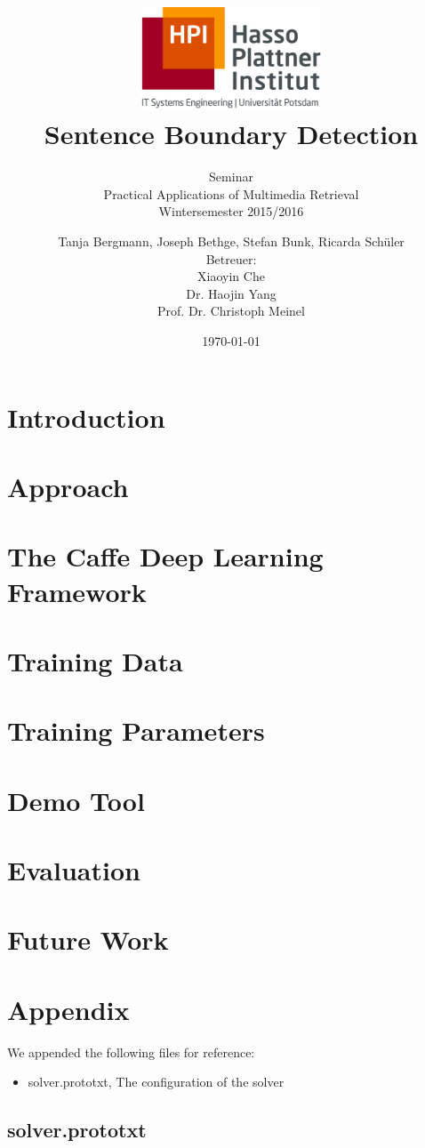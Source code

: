 \documentclass[a4paper,12pt,pagesize,headsepline,bibliography=totoc,titlepage]{scrartcl}
\title{
	\includegraphics*[width=0.4\textwidth]{img/hpi_logo.png}\\
	\vspace{24pt}
	Sentence Boundary Detection
}
\subtitle{
	Seminar\\
	Practical Applications of Multimedia Retrieval\\
	Wintersemester 2015/2016
}
\author{
	Tanja Bergmann, Joseph Bethge, Stefan Bunk, Ricarda Schüler\\[12pt]
	Betreuer:\\
    Xiaoyin Che\\
	Dr. Haojin Yang\\
	Prof. Dr. Christoph Meinel
}
\date{\today}
\begin{document}
\maketitle
\tableofcontents
\newpage

\section{Introduction}
\label{sec:introduction}


\section{Approach}
\label{sec:approach}


\section{The Caffe Deep Learning Framework}
\label{sec:caffe}


\section{Training Data}
\label{sec:training_data}


\section{Training Parameters}
\label{sec:training_parameters}


\section{Demo Tool}
\label{sec:demo}


\section{Evaluation}
\label{sec:evaluation}


\section{Future Work}
\label{sec:future}





\newpage
\appendix
\section{Appendix}
We appended the following files for reference:
\begin{itemize}
	\item solver.prototxt, The configuration of the solver
\end{itemize}

\subsection{solver.prototxt}

\end{document}

